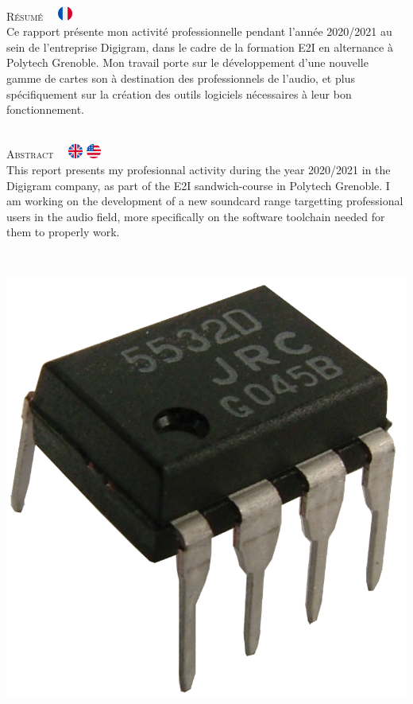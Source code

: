 
\thispagestyle{empty}
\cleartoevenpage
\thispagestyle{empty}

\ \vfill

{\huge\textsc{Résumé}}
\ \
\includegraphics[width=18px]{logos/france}
\ \\

Ce rapport présente mon activité professionnelle pendant l'année 2020/2021 au
sein de l'entreprise Digigram, dans le cadre de la formation E2I en alternance à
Polytech Grenoble. Mon travail porte sur le développement d'une nouvelle gamme
de cartes son à destination des professionnels de l'audio, et plus
spécifiquement sur la création des outils logiciels nécessaires à leur bon
fonctionnement.

\ \\

{\huge\textsc{Abstract}}
\ \
\includegraphics[width=18px]{logos/united-kingdom}
\includegraphics[width=18px]{logos/united-states}
\ \\


This report presents my profesionnal activity during the year 2020/2021 in the
Digigram company, as part of the E2I sandwich-course in Polytech Grenoble. I am
working on the development of a new soundcard range targetting professional
users in the audio field, more specifically on the software toolchain needed for
them to properly work.

\ \\

\begin{center}
	\includegraphics[scale=0.06]{logos/front-pic.png}
\end{center}

\vfill